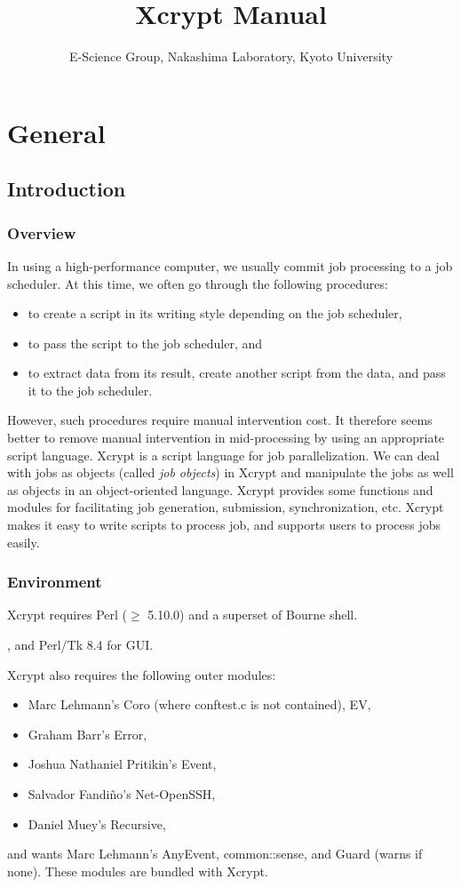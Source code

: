 \documentclass[a4paper,10pt]{report}
\title{Xcrypt Manual}
\author{E-Science Group, Nakashima Laboratory, Kyoto University}
\begin{document}
\maketitle
\tableofcontents

\part{General}
\chapter{Introduction}

\section{Overview}

In using a high-performance computer, we usually commit job processing
to a job scheduler.  At this time, we often go through the following
procedures:
\begin{itemize}
\item to create a script in its writing style depending on the
      job scheduler,
\item to pass the script to the job scheduler, and
\item to extract data from its result, create another script from
      the data, and pass it to the job scheduler.
\end{itemize}

However, such procedures require manual intervention cost.  It
therefore seems better to remove manual intervention in mid-processing
by using an appropriate script language.  Xcrypt is a script language
for job parallelization.  We can deal with jobs as objects (called
\textit{job objects}) in Xcrypt and manipulate the jobs as well as
objects in an object-oriented language.  Xcrypt provides some
functions and modules for facilitating job generation, submission,
synchronization, etc.  Xcrypt makes it easy to write scripts to process
job, and supports users to process jobs easily.

\section{Environment}

Xcrypt requires Perl ($\geq$ 5.10.0) and a superset of Bourne shell.

, and Perl/Tk 8.4 for GUI.
\fi

Xcrypt also requires the following outer modules:
\begin{itemize}
\item Marc Lehmann's Coro (where conftest.c is not contained), EV,
\item Graham Barr's Error,
\item Joshua Nathaniel Pritikin's Event,
\item Salvador Fandi\~no's Net-OpenSSH,
\item Daniel Muey's Recursive,
\end{itemize}
and wants Marc Lehmann's AnyEvent, common::sense, and Guard (warns if
none).  These modules are bundled with Xcrypt.
\end{document}
